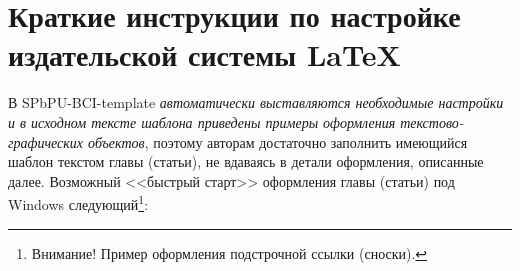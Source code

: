 \chapter{Краткие инструкции по настройке издательской системы \LaTeX}\label{appendix-MikTeX-TexStudio}							%

В SPbPU-BCI-template {\itshape автоматически выставляются необходимые настройки и в исходном тексте шаблона приведены примеры оформления текстово-графических объектов}, поэтому авторам достаточно заполнить имеющийся шаблон текстом главы (статьи), не вдаваясь в детали оформления, описанные далее. Возможный <<быстрый старт>> оформления главы (статьи) под Windows следующий\footnote{Внимание! Пример оформления подстрочной ссылки (сноски).}:

